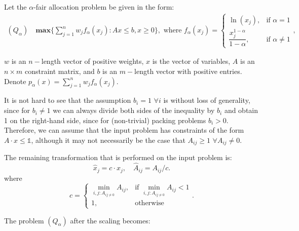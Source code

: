 \documentclass[11pt]{article}
\begin{document}
Let the $\alpha$-fair allocation problem be given in the form:
\begin{align*}
{(Q_\alpha)}\quad\textbf{max} \Big \{\sum_{j=1}^n w_jf_{\alpha}(x_j): Ax \leq b, 
x\geq 0\Big\},
\text{ where }
f_{\alpha}(x_j) = 
\begin{cases} \ln(x_j), & \mbox{if } \alpha=1 \\ \dfrac{x_j^{1-\alpha}}{1-\alpha}, & \mbox{if } \alpha\neq 1 \end{cases},
\end{align*}

\noindent $w$ is an $n-$length vector of positive weights, $x$ is the vector of variables, $A$ is an $n\times m$ constraint matrix, and $b$ is an $m-$length vector with positive entries. Denote $p_{\alpha}(x) = \sum_{j=1}^n w_jf_{\alpha}(x_j)$.

It is not hard to see that the assumption $b_i=1$ $\forall i$ is without loss of generality, since for $b_i \neq 1$ we can always divide both sides of the inequality by $b_i$ and obtain 1 on the right-hand side, since for (non-trivial) packing problems $b_i >0$. Therefore, we can assume that the input problem has constraints of the form $A\cdot x\leq \mathds{1}$, although it may not necessarily be the case that $A_{ij}\geq 1$ $\forall A_{ij}\neq 0$.

The remaining transformation that is performed on the input problem is:
\begin{equation*}
{\widehat{x}_j} = c\cdot x_j, \quad \widehat{A}_{ij}= A_{ij}/c.
\end{equation*}
where 
\begin{equation*}
c = \begin{cases}\min_{i, j: A_{ij\neq 0}}{A_{ij}}, & \mbox{if }  \min_{i, j: A_{ij\neq 0}}{A_{ij}}<1\\
1, & \mbox{otherwise} \end{cases}. \end{equation*}

The problem $(Q_\alpha)$ after the scaling becomes:
\end{document}
